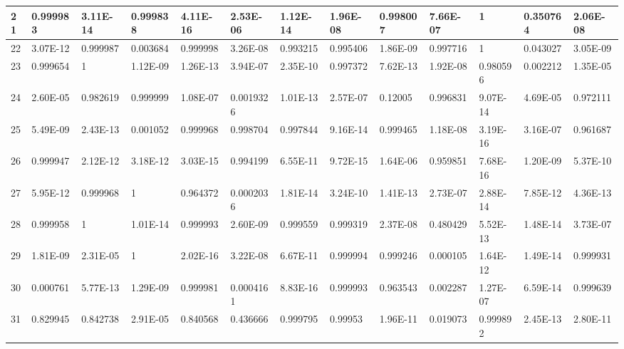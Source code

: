\documentclass[a4paper,10pt]{article}
\begin{document}
\begin{centering}
{\begin{tabular}{ |l|l|l|l|l|l|l|l|l|l|l|l|l| }
	21	       & 0.999983 & 3.11E-14 & 0.999838 & 4.11E-16 & 2.53E-06  & 1.12E-14       &  1.96E-08 & 0.998007 & 7.66E-07 & 1        & 0.350764 & 2.06E-08 \\ \hline                            
	22	       & 3.07E-12 & 0.999987 & 0.003684 & 0.999998 & 3.26E-08  & 0.993215       &  0.995406 & 1.86E-09 & 0.997716 & 1        & 0.043027 & 3.05E-09 \\ \hline                                
	23	       & 0.999654 & 1        & 1.12E-09 & 1.26E-13 & 3.94E-07  & 2.35E-10       &  0.997372 & 7.62E-13 & 1.92E-08 & 0.980596 & 0.002212 & 1.35E-05 \\ \hline                                       
	24	       & 2.60E-05 & 0.982619 & 0.999999 & 1.08E-07 & 0.0019326 &  1.01E-13      &  2.57E-07 & 0.12005  & 0.996831 & 9.07E-14 & 4.69E-05 & 0.972111 \\ \hline                                              
	25	       & 5.49E-09 & 2.43E-13 & 0.001052 & 0.999968 & 0.998704  &  0.997844      &  9.16E-14 & 0.999465 & 1.18E-08 & 3.19E-16 & 3.16E-07 & 0.961687 \\ \hline                                                
	26	       & 0.999947 & 2.12E-12 & 3.18E-12 & 3.03E-15 & 0.994199  &  6.55E-11      &  9.72E-15 & 1.64E-06 & 0.959851 & 7.68E-16 & 1.20E-09 & 5.37E-10 \\ \hline                                            
	27	       & 5.95E-12 & 0.999968 & 1        & 0.964372 & 0.0002036 &  1.81E-14      &  3.24E-10 & 1.41E-13 & 2.73E-07 & 2.88E-14 & 7.85E-12 & 4.36E-13 \\ \hline                                          
	28	       & 0.999958 & 1        & 1.01E-14 & 0.999993 & 2.60E-09  & 0.999559       &  0.999319 & 2.37E-08 & 0.480429 & 5.52E-13 & 1.48E-14 & 3.73E-07 \\ \hline                                  
	29	       & 1.81E-09 & 2.31E-05 & 1        & 2.02E-16 & 3.22E-08  & 6.67E-11       &  0.999994 & 0.999246 & 0.000105 & 1.64E-12 & 1.49E-14 & 0.999931 \\ \hline                                           
	30	       & 0.000761 & 5.77E-13 & 1.29E-09 & 0.999981 & 0.0004161 &  8.83E-16      &  0.999993 & 0.963543 & 0.002287 & 1.27E-07 & 6.59E-14 & 0.999639 \\ \hline                                                    
	31	       & 0.829945 & 0.842738 & 2.91E-05 & 0.840568 & 0.436666  &  0.999795      &  0.99953  & 1.96E-11 & 0.019073 & 0.999892 & 2.45E-13 & 2.80E-11 \\ \hline                                         

\end{tabular}}
\end{centering}
\end{document}
